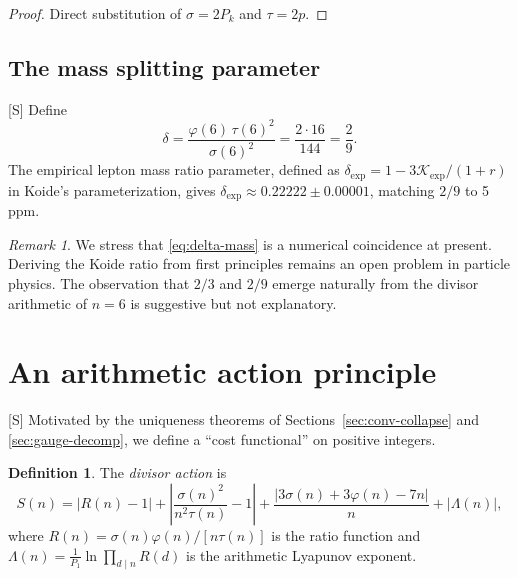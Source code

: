\documentclass[11pt,letterpaper]{article}
\theoremstyle{definition}
\newtheorem{definition}[theorem]{Definition}
\theoremstyle{remark}
\newtheorem*{remark}{Remark}
\newcommand{\speculative}{\textsf{[S]}}
\begin{document}
\begin{proof}
Direct substitution of $\sigma = 2P_k$ and $\tau = 2p$.
\end{proof}

\subsection{The mass splitting parameter}

\speculative{} Define
\begin{equation}\label{eq:delta-mass}
\delta = \frac{\varphi(6)\,\tau(6)^2}{\sigma(6)^2} = \frac{2 \cdot 16}{144} = \frac{2}{9}.
\end{equation}
The empirical lepton mass ratio parameter, defined as 
$\delta_{\exp} = 1 - 3\mathcal{K}_{\exp}/(1+r)$ in Koide's parameterization, 
gives $\delta_{\exp} \approx 0.22222 \pm 0.00001$, matching $2/9$ to 5\,ppm.

\begin{remark}
We stress that \eqref{eq:delta-mass} is a numerical coincidence at present.  
Deriving the Koide ratio from first principles remains an open problem 
in particle physics. The observation that $2/3$ and $2/9$ emerge naturally 
from the divisor arithmetic of $n=6$ is suggestive but not explanatory.
\end{remark}

\section{An arithmetic action principle}
\label{sec:action}

\speculative{} Motivated by the uniqueness theorems of Sections~\ref{sec:conv-collapse} 
and \ref{sec:gauge-decomp}, we define a ``cost functional'' on positive integers.

\begin{definition}\label{def:action}
The \emph{divisor action} is
\begin{equation}\label{eq:action}
S(n) = |R(n) - 1| + \left|\frac{\sigma(n)^2}{n^2\tau(n)} - 1\right| 
+ \frac{|3\sigma(n) + 3\varphi(n) - 7n|}{n} + |\Lambda(n)|,
\end{equation}
where $R(n) = \sigma(n)\varphi(n)/[n\tau(n)]$ is the ratio function and 
$\Lambda(n) = \frac{1}{P_1}\ln\!\prod_{d \mid n} R(d)$ is the arithmetic 
Lyapunov exponent.
\end{definition}
\end{document}
